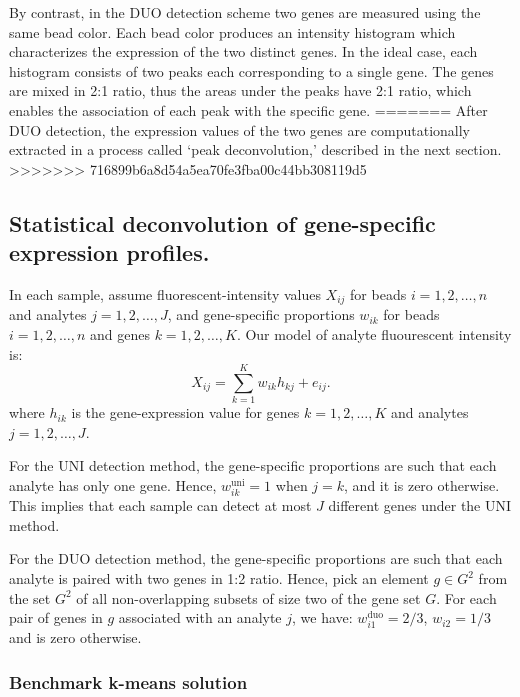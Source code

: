 \documentclass[]{article}
\begin{document}
By contrast, in the DUO detection scheme two genes are measured using
the same bead color. Each bead color produces an intensity histogram
which characterizes the expression of the two distinct genes. In the
ideal case, each histogram consists of two peaks each corresponding to a
single gene. The genes are mixed in 2:1 ratio, thus the areas under the
peaks have 2:1 ratio, which enables the association of each peak with
the specific gene.
=======
After DUO detection, the expression values of the two genes are
computationally extracted in a process called `peak deconvolution,'
described in the next section.
>>>>>>> 716899b6a8d54a5ea70fe3fba00c44bb308119d5

\hypertarget{statistical-deconvolution-of-gene-specific-expression-profiles.}{%
\subsection{Statistical deconvolution of gene-specific expression
profiles.}\label{statistical-deconvolution-of-gene-specific-expression-profiles.}}

In each sample, assume fluorescent-intensity values \(X_{ij}\) for beads
\(i=1,2,\dots, n\) and analytes \(j=1,2,\dots, J\), and gene-specific
proportions \(w_{ik}\) for beads \(i=1,2,\dots, n\) and genes
\(k=1,2,\dots, K\). Our model of analyte fluourescent intensity is: \[
  X_{ij} = \sum_{k=1}^{K} w_{ik} h_{kj} + e_{ij}. 
\] where \(h_{ik}\) is the gene-expression value for genes
\(k=1,2,\dots, K\) and analytes \(j=1,2,\dots, J\).

For the UNI detection method, the gene-specific proportions are such
that each analyte has only one gene. Hence, \(w^{\text{uni}}_{ik} = 1\)
when \(j = k\), and it is zero otherwise. This implies that each sample
can detect at most \(J\) different genes under the UNI method.

For the DUO detection method, the gene-specific proportions are such
that each analyte is paired with two genes in 1:2 ratio. Hence, pick an
element \(g\in G^2\) from the set \(G^2\) of all non-overlapping subsets
of size two of the gene set \(G\). For each pair of genes in \(g\)
associated with an analyte \(j\), we have:
\(w^{\text{duo}}_{i1} = 2/3\), \(w_{i2}=1/3\) and is zero otherwise.

\hypertarget{benchmark-k-means-solution}{%
\subsubsection{Benchmark k-means
solution}\label{benchmark-k-means-solution}}
\end{document}
